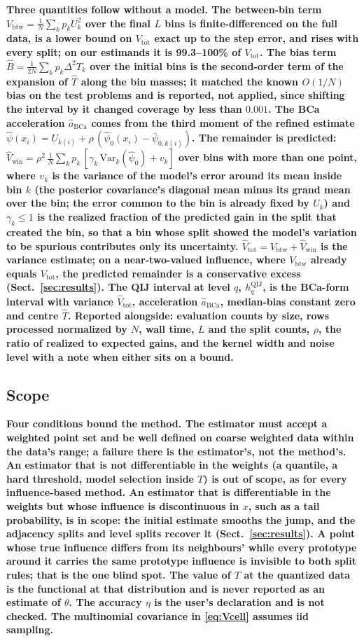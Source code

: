 \documentclass[runningheads]{llncs}
\newif\ifrev \revtrue
\newcommand{\rev}[1]{\ifrev{\color{blue}\bfseries #1}\else#1\fi}
\newcommand{\Vcell}{V_{\mathrm{btw}}}
\newcommand{\Vtotal}{V_{\mathrm{tot}}}
\newcommand{\Vwinhat}{\hat V_{\mathrm{win}}}
\newcommand{\Vtothat}{\hat V_{\mathrm{tot}}}
\newcommand{\psinull}{\hat{\psi}_0}
\newcommand{\psih}{\hat{\psi}}
\newcommand{\Bhat}{\hat{B}}
\newcommand{\hqij}[1]{h^{\mathrm{QIJ}}_{#1}}
\begin{document}
\rev{Three quantities follow without a model. The between-bin term $\Vcell = \frac1N\sum_k p_k U_k^2$ over the final $L$ bins is finite-differenced on the full data, is a lower bound on $\Vtotal$ exact up to the step error, and rises with every split; on our estimands it is 99.3--100\% of $\Vtotal$. The bias term $\Bhat = \frac{1}{2N}\sum_k p_k \Delta^2 T_k$ over the initial bins is the second-order term of the expansion of $\hat T$ along the bin masses; it matched the known $O(1/N)$ bias on the test problems and is reported, not applied, since shifting the interval by it changed coverage by less than $0.001$. The BCa acceleration $\hat a_{\mathrm{BCa}}$ comes from the third moment of the refined estimate $\psih(x_i) = U_{k(i)} + \rho\,(\psinull(x_i) - \bar\psi_{0,k(i)})$. The remainder is predicted: $\Vwinhat = \rho^2\,\frac1N\sum_k p_k\,[\gamma_k\,\mathrm{Var}_k(\psinull) + v_k]$ over bins with more than one point, where $v_k$ is the variance of the model's error around its mean inside bin $k$ (the posterior covariance's diagonal mean minus its grand mean over the bin; the error common to the bin is already fixed by $U_k$) and $\gamma_k \le 1$ is the realized fraction of the predicted gain in the split that created the bin, so that a bin whose split showed the model's variation to be spurious contributes only its uncertainty. $\Vtothat = \Vcell + \Vwinhat$ is the variance estimate; on a near-two-valued influence, where $\Vcell$ already equals $\Vtotal$, the predicted remainder is a conservative excess (Sect.~\ref{sec:results}). The QIJ interval at level $q$, $\hqij{q}$, is the BCa-form interval with variance $\Vtothat$, acceleration $\hat a_{\mathrm{BCa}}$, median-bias constant zero and centre $\hat T$. Reported alongside: evaluation counts by size, rows processed normalized by $N$, wall time, $L$ and the split counts, $\rho$, the ratio of realized to expected gains, and the kernel width and noise level with a note when either sits on a bound.}

\subsection{Scope}\label{sec:scope}

\rev{Four conditions bound the method. The estimator must accept a weighted point set and be well defined on coarse weighted data within the data's range; a failure there is the estimator's, not the method's. An estimator that is not differentiable in the weights (a quantile, a hard threshold, model selection inside $T$) is out of scope, as for every influence-based method. An estimator that is differentiable in the weights but whose influence is discontinuous in $x$, such as a tail probability, is in scope: the initial estimate smooths the jump, and the adjacency splits and level splits recover it (Sect.~\ref{sec:results}). A point whose true influence differs from its neighbours' while every prototype around it carries the same prototype influence is invisible to both split rules; that is the one blind spot. The value of $T$ at the quantized data is the functional at that distribution and is never reported as an estimate of $\theta$. The accuracy $\eta$ is the user's declaration and is not checked. The multinomial covariance in \eqref{eq:Vcell} assumes iid sampling.}
\end{document}
